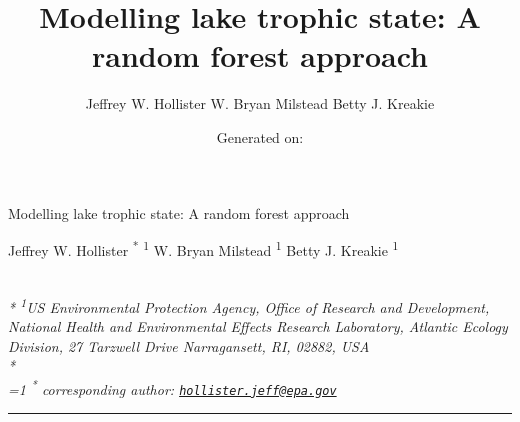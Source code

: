 \documentclass[12pt,]{article}
\title{Modelling lake trophic state: A random forest approach}
\author{
Jeffrey W. Hollister
W. Bryan Milstead
Betty J. Kreakie
}
\date{Generated on: }
\begin{document}
\begin{singlespace}
\begin{center}
\huge Modelling lake trophic state: A random forest approach
\end{center}
\begin{center}
\large
Jeffrey W. Hollister \textsuperscript{*} \textsuperscript{1} 
W. Bryan Milstead \textsuperscript{1} 
Betty J. Kreakie \textsuperscript{1} 
\end{center}
\begin{justify}
\footnotesize \emph{ 
\\*
\textsuperscript{1}US Environmental Protection Agency, Office of Research and Development,
National Health and Environmental Effects Research Laboratory, Atlantic
Ecology Division, 27 Tarzwell Drive Narragansett, RI, 02882, USA\\*
}
\setcounter{num}{1}
\\[0.1cm]
\footnotesize \emph{ 
\ifnum\value{num}=1%
\textsuperscript{*} corresponding author:
\fi
\href{mailto:hollister.jeff@epa.gov}{\nolinkurl{hollister.jeff@epa.gov}}
}
\end{justify}
\normalsize

\end{singlespace}


\singlespace

\vspace{2mm}

\hrule
\end{document}
